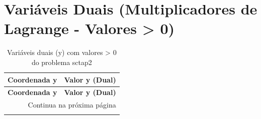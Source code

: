 \documentclass[12pt]{article}
\begin{document}
\section{Variáveis Duais (Multiplicadores de Lagrange - Valores > 0)}

\begin{longtable}{@{}cc@{}}
\caption{Variáveis duais (y) com valores > 0 do problema sctap2} \\
\toprule
\textbf{Coordenada y} & \textbf{Valor y (Dual)} \\
\midrule
\endfirsthead

\toprule
\textbf{Coordenada y} & \textbf{Valor y (Dual)} \\
\midrule
\endhead

\midrule \multicolumn{2}{r}{{Continua na próxima página}} \\ \midrule
\endfoot


\end{longtable}
\end{document}
